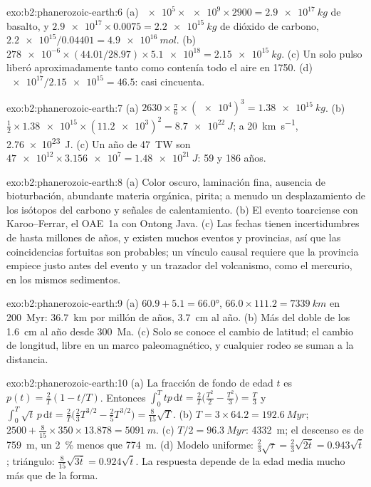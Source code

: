 \begin{solution}{exo:b2:phanerozoic-earth:6}
(a) $\num{e5} \times \num{e9} \times 2900 = \qty{2.9e17}{kg}$ de basalto, y $\num{2.9e17}
\times 0.0075 = \qty{2.2e15}{kg}$ de dióxido de carbono, $\num{2.2e15}/0.04401 = \qty{4.9e16}{mol}$.
(b) $\num{278e-6} \times (44.01/28.97) \times \num{5.1e18} = \qty{2.15e15}{kg}$. (c) Un solo pulso
liberó aproximadamente tanto como contenía todo el aire en 1750. (d) $\num{e17}/\num{2.15e15} = 46.5$: casi cincuenta.
\end{solution}

\begin{solution}{exo:b2:phanerozoic-earth:7}
(a) $2630 \times \frac{\pi}{6} \times (\num{e4})^3 = \qty{1.38e15}{kg}$. (b) $\tfrac12 \times
\num{1.38e15} \times (\num{11.2e3})^2 = \qty{8.7e22}{J}$; a \qty{20}{km.s^{-1}},
\qty{2.76e23}{J}. (c) Un año de \qty{47}{TW} son $\num{47e12} \times \num{3.156e7} =
\qty{1.48e21}{J}$: 59 y 186 años.
\end{solution}

\begin{solution}{exo:b2:phanerozoic-earth:8}
(a) Color oscuro, laminación fina, ausencia de bioturbación, abundante materia orgánica, pirita; a menudo un desplazamiento de los
isótopos del carbono y señales de calentamiento. (b) El evento toarciense con Karoo--Ferrar, el OAE~1a con
Ontong Java. (c) Las fechas tienen incertidumbres de hasta millones de años, y existen muchos eventos y
provincias, así que las coincidencias fortuitas son probables; un vínculo causal requiere que la provincia empiece
justo antes del evento y un trazador del volcanismo, como el mercurio, en los mismos sedimentos.
\end{solution}

\begin{solution}{exo:b2:phanerozoic-earth:9}
(a) $60.9 + 5.1 = \ang{66.0}$, $66.0 \times 111.2 = \qty{7339}{km}$ en \qty{200}{Myr}:
\qty{36.7}{km} por millón de años, \qty{3.7}{cm} al año. (b) Más del doble de los
\qty{1.6}{cm} al año desde \qty{300}{Ma}. (c) Solo se conoce el cambio de latitud; el cambio de
longitud, libre en un marco paleomagnético, y cualquier rodeo se suman a la distancia.
\end{solution}

\begin{solution}{exo:b2:phanerozoic-earth:10}
(a) La fracción de fondo de edad $t$ es $p(t) = \frac2T(1 - t/T)$. Entonces $\int_0^T tp\,\mathrm{d}t =
\frac2T\bigl(\frac{T^2}2 - \frac{T^2}3\bigr) = \frac T3$ y $\int_0^T \sqrt t\,p\,\mathrm{d}t =
\frac2T\bigl(\frac23 T^{3/2} - \frac25 T^{3/2}\bigr) = \frac8{15}\sqrt T$. (b) $T = 3 \times 64.2 =
\qty{192.6}{Myr}$; $2500 + \frac8{15} \times 350 \times 13.878 = \qty{5091}{m}$. (c) $T/2 =
\qty{96.3}{Myr}$: \qty{4332}{m}; el descenso es de \qty{759}{m}, un \qty{2}{\percent} menos que
\qty{774}{m}. (d) Modelo uniforme: $\frac23\sqrt\tau = \frac23\sqrt{2\bar t} = 0.943\sqrt{\bar t}$;
triángulo: $\frac8{15}\sqrt{3\bar t} = 0.924\sqrt{\bar t}$. La respuesta depende de la edad media mucho
más que de la forma.
\end{solution}

